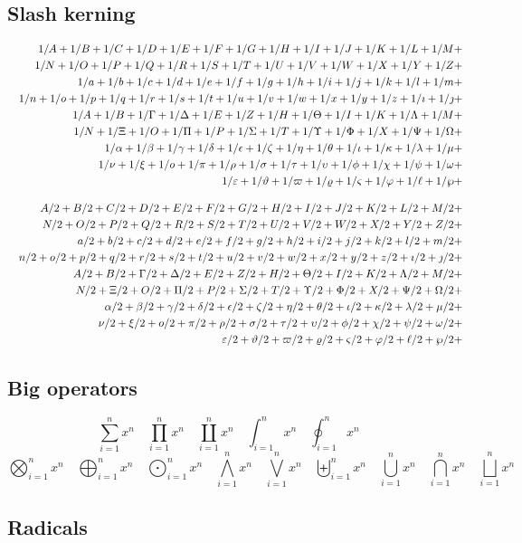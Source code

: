 \documentclass{article}
\def\test#1{#1}
\def\testupperi{%
  \test A \test B \test C \test D \test E \test F \test G \test H
  \test I \test J \test K \test L \test M }
\def\testupperii{%
  \test N \test O \test P \test Q \test R \test S \test T \test U
  \test V \test W \test X \test Y \test Z }
\def\testloweri{%
  \test a \test b \test c \test d \test e \test f \test g \test h
  \test i \test j \test k \test l \test m }
\def\testlowerii{%
  \test n \test o \test p \test q \test r \test s \test t \test u
  \test v \test w \test x \test y \test z 
  \test\imath \test\jmath }
\def\testupgreeki{%
  \test A \test B \test\Gamma \test\Delta \test E \test Z \test H
  \test\Theta \test I \test K \test\Lambda \test M }
\def\testupgreekii{%
  \test N \test\Xi \test O \test\Pi \test P \test\Sigma \test T
  \test\Upsilon \test\Phi \test X \test\Psi \test\Omega 
}
\def\testlowgreeki{%
  \test\alpha \test\beta \test\gamma \test\delta \test\epsilon
  \test\zeta \test\eta \test\theta \test\iota \test\kappa \test\lambda
  \test\mu }
\def\testlowgreekii{%
  \test\nu \test\xi \test o \test\pi \test\rho \test\sigma \test\tau
  \test\upsilon \test\phi \test\chi \test\psi \test\omega }
\def\testlowgreekiii{%
  \test\varepsilon \test\vartheta \test\varpi \test\varrho
  \test\varsigma \test\varphi \test\ell \test\wp}
\begin{document}
\clearpage
\subsection{Slash kerning}

\def\test#1{1/#1+}
\begin{eqnarray*}
  && {\testupperi}\\
  && {\testupperii}\\
  && {\testloweri}\\ 
  && {\testlowerii}\\ 
  && {\testupgreeki}\\
  && {\testupgreekii}\\
  && {\testlowgreeki}\\
  && {\testlowgreekii}\\
  && {\testlowgreekiii}
\end{eqnarray*}

\def\test#1{#1/2+}
\begin{eqnarray*}
  && {\testupperi}\\
  && {\testupperii}\\
  && {\testloweri}\\ 
  && {\testlowerii}\\ 
  && {\testupgreeki}\\
  && {\testupgreekii}\\
  && {\testlowgreeki}\\
  && {\testlowgreekii}\\
  && {\testlowgreekiii}
\end{eqnarray*}


\clearpage
\subsection{Big operators}

\def\testop#1{#1_{i=1}^{n} x^{n} \quad}
\begin{displaymath}
  \testop\sum 
  \testop\prod 
  \testop\coprod 
  \testop\int 
  \testop\oint
\end{displaymath}
\begin{displaymath}
  \testop\bigotimes 
  \testop\bigoplus
  \testop\bigodot
  \testop\bigwedge 
  \testop\bigvee 
  \testop\biguplus 
  \testop\bigcup 
  \testop\bigcap 
  \testop\bigsqcup 
\end{displaymath}


\subsection{Radicals}
\end{document}
